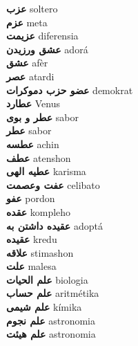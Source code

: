 \textbf{ عزب  } soltero \\
\textbf{ عزم  } meta \\
\textbf{ عزیمت  } diferensia \\
\textbf{ عشق ورزیدن  } adorá \\
\textbf{ عشق  } afèr \\
\textbf{ عصر  } atardi \\
\textbf{ عضو حزب دموکرات  } demokrat \\
\textbf{ عطارد  } Venus \\
\textbf{ عطر و بوی  } sabor \\
\textbf{ عطر  } sabor \\
\textbf{ عطسه  } achin \\
\textbf{ عطف  } atenshon \\
\textbf{ عطیه الهی  } karisma \\
\textbf{ عفت وعصمت  } celibato \\
\textbf{ عفو  } pordon \\
\textbf{ عقده  } kompleho \\
\textbf{ عقیده داشتن به  } adoptá \\
\textbf{ عقیده  } kredu \\
\textbf{ علاقه  } stimashon \\
\textbf{ علت  } malesa \\
\textbf{ علم الحیات  } biologia \\
\textbf{ علم حساب  } aritmétika \\
\textbf{ علم شیمی  } kímika \\
\textbf{ علم نجوم  } astronomia \\
\textbf{ علم هیئت  } astronomia \\
